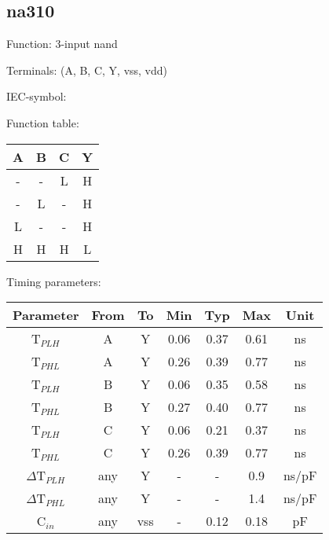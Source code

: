 \subsection{na310}

Function: 3-input nand

Terminals: (A, B, C, Y, vss, vdd)


IEC-symbol:
\begin{figure}[bth]
\end{figure}

\begin{minipage}[t]{0.3\textwidth}
Function table:\\

\begin{tabular}{|c|c|c||c|}
\hline
A	&B	&C	&Y\\
\hline
-	&-	&L	&H\\
-	&L	&-	&H\\
L	&-	&-	&H\\
H	&H	&H	&L\\
\hline
\end{tabular}
\end{minipage}
\hfill
\begin{minipage}[t]{0.6\textwidth}
Timing parameters:\\

\begin{tabular}{|c|cc|ccc|c|}
\hline
Parameter               &From            &To	&Min	&Typ	&Max    &Unit\\
\hline
T$_{PLH}$               &A     		&Y      &0.06	&0.37	&0.61    &ns\\
T$_{PHL}$               &A    		&Y      &0.26	&0.39	&0.77    &ns\\
T$_{PLH}$               &B     		&Y      &0.06	&0.35	&0.58    &ns\\
T$_{PHL}$               &B    		&Y      &0.27	&0.40	&0.77    &ns\\
T$_{PLH}$               &C     		&Y      &0.06	&0.21	&0.37    &ns\\
T$_{PHL}$               &C    		&Y      &0.26	&0.39	&0.77    &ns\\
\hline
$\Delta$T$_{PLH}$       &any          	&Y      &-	&-	&0.9    &ns/pF\\
$\Delta$T$_{PHL}$       &any           	&Y      &-	&-	&1.4    &ns/pF\\
\hline
C$_{in}$                &any	    	&vss    &-	&0.12   &0.18	&pF\\
\hline
\end{tabular}
\end{minipage}
\\

